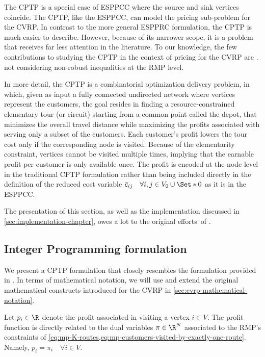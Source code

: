 The CPTP is a special case of ESPPCC where the source and sink vertices coincide.
The CPTP, like the ESPPCC, can model the pricing sub-problem for the CVRP.
In contrast to the more general ESPPRC formulation, the CPTP is much easier to describe.
However, because of its narrower scope, it is a problem that receives far less attention in the literature.
To our knowledge, the few contributions to studying the CPTP in the context of pricing
for the CVRP are \textcite{bixby1999polyhedral, jepsen2011,jepsen2014}.
not considering non-robust inequalities at the RMP level.

\medskip

In more detail,
the CPTP is a combinatorial optimization delivery problem,
in which,
given as input a fully connected undirected network where vertices represent the customers,
the goal resides in finding a resource-constrained elementary tour (or circuit)
starting from a common point called the depot,
that minimizes the overall travel distance while maximizing
the profits associated with serving only a subset of the customers.
Each customer's profit lowers the tour cost only if the corresponding node is visited.
Because of the elementarity constraint,
vertices cannot be visited multiple times,
implying that the earnable profit per customer is only available once.
The profit is encoded at the node level in the traditional CPTP formulation \parencite{jepsen2014}
rather than being included directly in the definition of the reduced cost variable
$\bar{c}_{ij} \quad \forall i, j \in V_0 \cup \Set*{0}$ as it is in the ESPPCC.

The presentation of this section, as well as the implementation discussed
in \cref{sec:implementation-chapter},
owes a lot to the original efforts of \textcite{jepsen2014}.

\subsection{Integer Programming formulation}
\label{sec:cptp-integer-programming-formulation}

We present a CPTP formulation that closely resembles the formulation provided in \textcite{jepsen2014}.
In terms of mathematical notation, we will use and extend the original
mathematical constructs introduced for the CVRP in \cref{sec:cvrp-mathematical-notation}.

Let $p_i \in \R$ denote the profit associated in visiting a vertex $i \in V$.
The profit function is directly related to the dual variables $\pi \in \R^N$ associated to
the RMP's constraints of \cref{eq:mp-K-routes,eq:mp-customers-visited-by-exactly-one-route}.
Namely, $p_i = \pi_i \quad \forall i \in V$.

